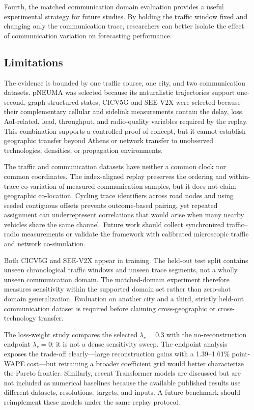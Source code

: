 \documentclass[pdflatex,sn-mathphys-num]{sn-jnl}%
\newenvironment{changed}{\color{blue}}{}
\theoremstyle{thmstyleone}%
\theoremstyle{thmstyletwo}%
\theoremstyle{thmstylethree}%
\begin{document}
Fourth, the matched communication domain evaluation provides a useful experimental strategy for future studies. By holding the traffic window fixed and changing only the communication trace, researchers can better isolate the effect of communication variation on forecasting performance.

\subsection{Limitations}
\label{subsec:discussion_limitations}

\begin{changed}
The evidence is bounded by one traffic source, one city, and two communication datasets. pNEUMA was selected because its naturalistic trajectories support one-second, graph-structured states; CICV5G and SEE-V2X were selected because their complementary cellular and sidelink measurements contain the delay, loss, AoI-related, load, throughput, and radio-quality variables required by the replay. This combination supports a controlled proof of concept, but it cannot establish geographic transfer beyond Athens or network transfer to unobserved technologies, densities, or propagation environments.

The traffic and communication datasets have neither a common clock nor common coordinates. The index-aligned replay preserves the ordering and within-trace co-variation of measured communication samples, but it does not claim geographic co-location. Cycling trace identifiers across road nodes and using seeded contiguous offsets prevents outcome-based pairing, yet repeated assignment can underrepresent correlations that would arise when many nearby vehicles share the same channel. Future work should collect synchronized traffic--radio measurements or validate the framework with calibrated microscopic traffic and network co-simulation.

Both CICV5G and SEE-V2X appear in training. The held-out test split contains unseen chronological traffic windows and unseen trace segments, not a wholly unseen communication domain. The matched-domain experiment therefore measures sensitivity within the supported domain set rather than zero-shot domain generalization. Evaluation on another city and a third, strictly held-out communication dataset is required before claiming cross-geographic or cross-technology transfer.

The loss-weight study compares the selected \(\lambda_r=0.3\) with the no-reconstruction endpoint \(\lambda_r=0\); it is not a dense sensitivity sweep. The endpoint analysis exposes the trade-off clearly---large reconstruction gains with a 1.39--1.61\% point-WAPE cost---but retraining a broader coefficient grid would better characterize the Pareto frontier. Similarly, recent Transformer models are discussed but are not included as numerical baselines because the available published results use different datasets, resolutions, targets, and inputs. A future benchmark should reimplement these models under the same replay protocol.


\end{changed}
\end{document}
